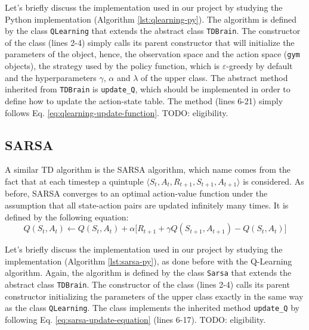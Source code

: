 Let's briefly discuss the implementation used in our project by studying
the Python implementation (Algorithm \ref{lst:qlearning-py}). The algorithm
is defined by the class \texttt{QLearning} that extends the abstract class
\texttt{TDBrain}. The constructor of the class (lines 2-4) simply calls its
parent constructor that will initialize the parameters of the object, hence,
the observation space and the action space (\texttt{gym} objects), the strategy
used by the policy function, which is $\varepsilon$-greedy by default and the
hyperparameters $\gamma$, $\alpha$ and $\lambda$ of the upper class.
The abstract method inherited from \texttt{TDBrain} is \texttt{update\_Q},
which should be implemented in order to define how to update the action-state
table. The method (lines 6-21) simply follows Eq.
\ref{eq:qlearning-update-function}. TODO: eligibility.


\subsection{SARSA}
A similar TD algorithm is the SARSA algorithm, which name
comes from the fact that at each timestep a quintuple $\langle S_t, A_t,
R_{t+1}, S_{t+1}, A_{t+1} \rangle$ is considered. As before, SARSA converges
to an optimal action-value function under the assumption that all state-action
pairs are updated infinitely many times. It is defined
\cite{Suttonrl18} by the following equation:
\begin{equation}
    \label{eq:sarsa-update-equation}
    Q(S_t, A_t) \leftarrow Q(S_t, A_t) + \alpha \Big[ R_{t+1} +
        \gamma Q(S_{t+1}, A_{t+1}) - Q(S_t, A_t) \Big]
\end{equation}

Let's briefly discuss the implementation used in our project by studying the
implementation (Algorithm \ref{lst:sarsa-py}), as done before with the
Q-Learning algorithm. Again, the algorithm is defined by the class
\texttt{Sarsa} that extends the abstract class \texttt{TDBrain}. The constructor
of the class (lines 2-4) calls its parent constructor initializing the
parameters of the upper class exactly in the same way as the class
\texttt{QLearning}. The class implements the inherited method
\texttt{update\_Q} by following Eq. \ref{eq:sarsa-update-equation} (lines
6-17). TODO: eligibility.

